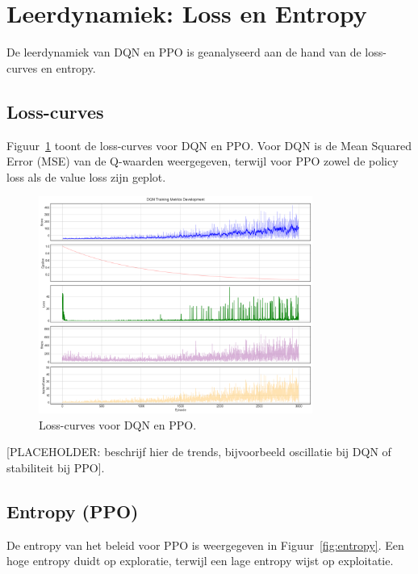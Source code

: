 \documentclass[a4paper,10pt]{report}
\begin{document}
\section{Leerdynamiek: Loss en Entropy}
De leerdynamiek van DQN en PPO is geanalyseerd aan de hand van de loss-curves
en entropy.

\subsection{Loss-curves}
Figuur~\ref{fig:loss_curves} toont de loss-curves voor DQN en PPO. Voor DQN is
de Mean Squared Error (MSE) van de Q-waarden weergegeven, terwijl voor PPO
zowel de policy loss als de value loss zijn geplot.

\begin{figure}[ht]
    \centering
    \includegraphics[width=0.8\textwidth]{../Experimenten/Snake/DQN/dqn_analysis.png}
    \caption{Loss-curves voor DQN en PPO.}
    \label{fig:loss_curves}
\end{figure}

[PLACEHOLDER: beschrijf hier de trends, bijvoorbeeld oscillatie bij DQN of stabiliteit bij PPO].

\subsection{Entropy (PPO)}
De entropy van het beleid voor PPO is weergegeven in Figuur~\ref{fig:entropy}.
Een hoge entropy duidt op exploratie, terwijl een lage entropy wijst op
exploitatie.
\end{document}
